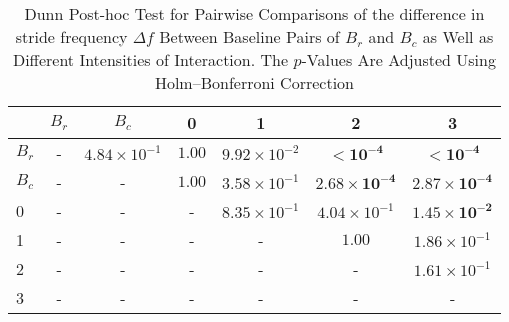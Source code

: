 \begin{table*}[!t]
\caption{Dunn Post-hoc Test for Pairwise Comparisons of the difference in stride frequency $\Delta f$ Between Baseline Pairs of $B_r$ and $B_c$ as Well as Different Intensities of Interaction. The $p$-Values Are Adjusted Using Holm--Bonferroni Correction\label{tab:dunn_delta_f}}
\centering
\begin{tabular}{lcccccc}
\toprule
 & $B_r$ & $B_c$ & 0 & 1 & 2 & 3 \\
\midrule
$B_r$ & - & $4.84 \times 10^{-1}$ & $1.00$ & $9.92 \times 10^{-2}$ & $\mathbf{< 10^{-4}}$ & $\mathbf{< 10^{-4}}$ \\
$B_c$ & - & - & $1.00$ & $3.58 \times 10^{-1}$ & $\mathbf{2.68 \times 10^{-4}}$ & $\mathbf{2.87 \times 10^{-4}}$ \\
0 & - & - & - & $8.35 \times 10^{-1}$ & $4.04 \times 10^{-1}$ & $\mathbf{1.45 \times 10^{-2}}$ \\
1 & - & - & - & - & $1.00$ & $1.86 \times 10^{-1}$ \\
2 & - & - & - & - & - & $1.61 \times 10^{-1}$ \\
3 & - & - & - & - & - & - \\
\bottomrule
\end{tabular}
\end{table*}
